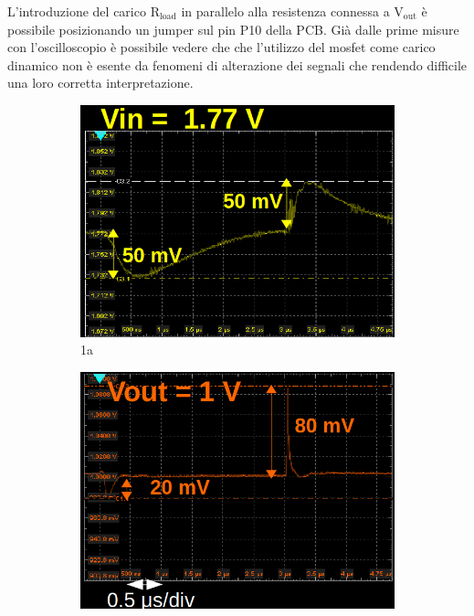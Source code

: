 L'introduzione del carico $\mathrm{R_{load}}$ in parallelo alla resistenza connessa a $\mathrm{V_{out}}$ è possibile posizionando un jumper sul pin P10 della PCB.
Già dalle prime misure con l'oscilloscopio è possibile vedere che che l'utilizzo del mosfet come carico dinamico non è esente da fenomeni di alterazione dei segnali che rendendo difficile una loro corretta interpretazione. 
\begin{figure}
\begin{subfigure}{.5\textwidth}
  \centering
  \includegraphics[width=.96\linewidth]{Immagini/zoomTransientTest1}
  \caption{1a}
  \label{TransientTest:sfig1}
\end{subfigure}%
\begin{subfigure}{.5\textwidth}
  \centering
  \includegraphics[width=.95\linewidth]{Immagini/zoomTransientTest2}

\end{subfigure}
\end{figure}
